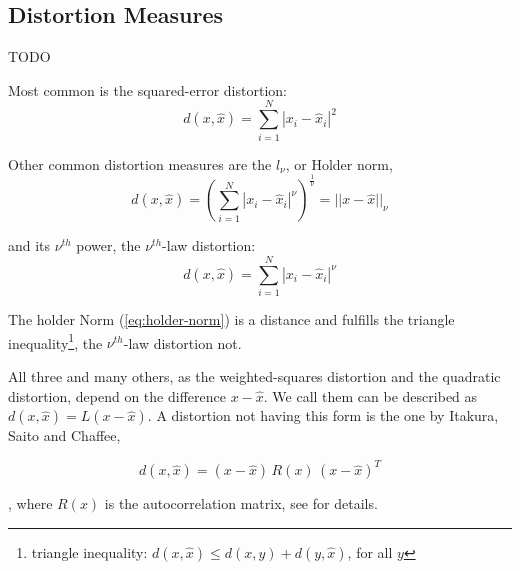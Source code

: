 \subsection{Distortion Measures}\label{sec:lvq-distortion-measures}
TODO

Most common is the squared-error distortion:
\begin{equation}
d(x, \hat{x}) = \sum_{i=1}^N |x_i - \hat{x}_i|^2
\end{equation}

Other common distortion measures are the $l_\nu$, or Holder norm,
\begin{equation}\label{eq:holder-norm}
d(x, \hat{x}) = \left( \sum_{i=1}^N |x_i - \hat{x}_i|^\nu \right) ^{\frac{1}{\nu}} = || x - \hat{x} ||_\nu
\end{equation}

and its $\nu^{th}$ power, the $\nu^{th}$-law distortion:
\begin{equation}
d(x, \hat{x}) = \sum_{i=1}^N |x_i - \hat{x}_i|^\nu
\end{equation}

The holder Norm (\ref{eq:holder-norm}) is a distance and fulfills the triangle inequality\footnote{triangle inequality: $d(x, \hat{x}) \leq d(x, y) + d(y, \hat{x})$, for all $y$}, the $\nu^{th}$-law distortion not.

All three and many others, as the weighted-squares distortion and the quadratic distortion, depend on the difference $x - \hat{x}$. We call them can be described as $d(x, \hat{x}) = L(x - \hat{x})$. A distortion not having this form is the one by Itakura, Saito and Chaffee,

\begin{equation}
d(x, \hat{x}) = (x - \hat{x})\, R(x)\, (x - \hat{x})^T
\end{equation}

, where $R(x)$ is the autocorrelation matrix, see \cite{Linde1980} for details.
